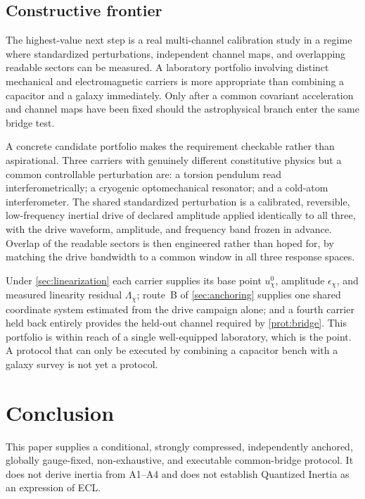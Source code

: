 \documentclass[11pt]{article}
\begin{document}
\subsection{Constructive frontier}
\label{sec:frontier}

The highest-value next step is a real multi-channel calibration study in a regime where standardized perturbations, independent channel maps, and overlapping readable sectors can be measured. A laboratory portfolio involving distinct mechanical and electromagnetic carriers is more appropriate than combining a capacitor and a galaxy immediately. Only after a common covariant acceleration and channel maps have been fixed should the astrophysical branch enter the same bridge test.

A concrete candidate portfolio makes the requirement checkable rather than aspirational. Three carriers with genuinely different constitutive physics but a common controllable perturbation are: a torsion pendulum read interferometrically; a cryogenic optomechanical resonator; and a cold-atom interferometer. The shared standardized perturbation is a calibrated, reversible, low-frequency inertial drive of declared amplitude applied identically to all three, with the drive waveform, amplitude, and frequency band frozen in advance. Overlap of the readable sectors is then engineered rather than hoped for, by matching the drive bandwidth to a common window in all three response spaces.

Under \cref{sec:linearization} each carrier supplies its base point \(u_{\chi}^{0}\), amplitude \(\epsilon_{\chi}\), and measured linearity residual \(\Lambda_{\chi}\); route~B of \cref{sec:anchoring} supplies one shared coordinate system estimated from the drive campaign alone; and a fourth carrier held back entirely provides the held-out channel required by \cref{prot:bridge}. This portfolio is within reach of a single well-equipped laboratory, which is the point. A protocol that can only be executed by combining a capacitor bench with a galaxy survey is not yet a protocol.

\section{Conclusion}

\begin{tcolorbox}[title=Final classification,colback=white,colframe=black]
This paper supplies a conditional, strongly compressed, independently anchored, globally gauge-fixed, non-exhaustive, and executable common-bridge protocol. It does not derive inertia from A1--A4 and does not establish Quantized Inertia as an expression of ECL.
\end{tcolorbox}
\end{document}
